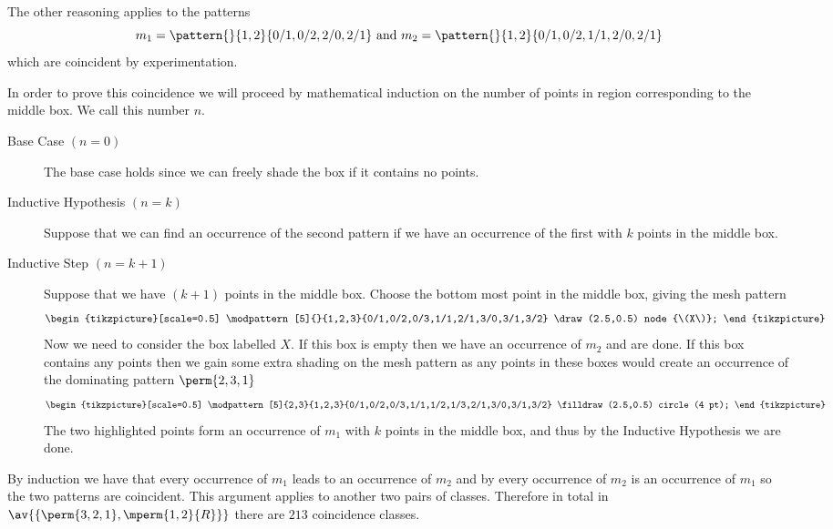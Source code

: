 The other reasoning applies to the patterns
\begin{equation*}
    m_1 = \pattern{}{1,2}{0/1,0/2,2/0,2/1} \text{ and } m_2 = \pattern{}{1,2}{0/1,0/2,1/1,2/0,2/1}
\end{equation*}
which are coincident by experimentation.

In order to prove this coincidence we will proceed by mathematical
induction on the number of points in region corresponding to the middle box.
We call this number \(n\).
\begin{description}
    \item [Base Case \((n=0)\)] The base case holds since we can freely shade the
        box if it contains no points.
    \item [Inductive Hypothesis \((n=k)\)] Suppose that we can find an occurrence
        of the second pattern if we have an occurrence of the first with \(k\) points
        in the middle box.
    \item [Inductive Step \((n=k+1)\)] Suppose that we have \((k+1)\) points in
        the middle box. Choose the bottom most point in the middle box, giving the
        mesh pattern
     \begin{equation*}
        \begin{tikzpicture}[scale=0.5]
            \modpattern[5]{}{1,2,3}{0/1,0/2,0/3,1/1,2/1,3/0,3/1,3/2}
            \draw (2.5,0.5) node {\(X\)};
        \end{tikzpicture}
    \end{equation*}
        Now we need to consider the box labelled \(X\). If this box is empty then
        we have an occurrence of \(m_2\) and are done. If this box contains
        any points then we gain some extra shading on the mesh pattern
        as any points in these boxes would create an occurrence of the dominating pattern \(\perm{2,3,1}\)
     \begin{equation*}
        \begin{tikzpicture}[scale=0.5]
            \modpattern[5]{2,3}{1,2,3}{0/1,0/2,0/3,1/1,1/2,1/3,2/1,3/0,3/1,3/2}
            \filldraw (2.5,0.5) circle (4 pt);
        \end{tikzpicture}
    \end{equation*}
        The two highlighted points form an occurrence of \(m_1\) with \(k\)
        points in the middle box, and thus by the Inductive Hypothesis we
        are done.
\end{description}
By induction we have that every occurrence of \(m_1\) leads to an occurrence of \(m_2\)
and by  every occurrence of \(m_2\) is an occurrence of
\(m_1\) so the two patterns are coincident.
This argument applies to another two pairs of classes. Therefore in
total in \(\av{\{\perm{3,2,1}, \mperm{1,2}{R}\}}\) there are \(213\) coincidence
classes.
